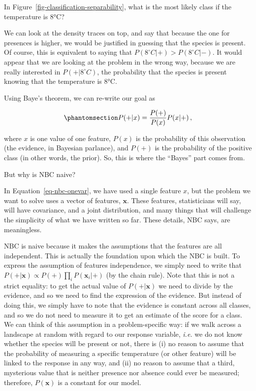 \documentclass[
  letterpaper,
]{scrbook}
\begin{document}
In Figure~\ref{fig-classification-separability}, what is the most likely
class if the temperature is 8°C?

We can look at the density traces on top, and say that because the one
for presences is higher, we would be justified in guessing that the
species is present. Of course, this is equivalent to saying that
\(P(8^\circ C | +) > P(8^\circ C | -)\). It would appear that we are
looking at the problem in the wrong way, because we are really
interested in \(P(+ | 8^\circ C)\), the probability that the species is
present knowing that the temperature is 8°C.

Using Baye's theorem, we can re-write our goal as

\begin{equation}\phantomsection\label{eq-nbc-onevar}{
P(+|x) = \frac{P(+)}{P(x)}P(x|+) \,,
}\end{equation}

where \(x\) is one value of one feature, \(P(x)\) is the probability of
this observation (the evidence, in Bayesian parlance), and \(P(+)\) is
the probability of the positive class (in other words, the prior). So,
this is where the ``Bayes'' part comes from.

But why is NBC naive?

In Equation~\ref{eq-nbc-onevar}, we have used a single feature \(x\),
but the problem we want to solve uses a vector of features,
\(\mathbf{x}\). These features, statisticians will say, will have
covariance, and a joint distribution, and many things that will
challenge the simplicity of what we have written so far. These details,
NBC says, are meaningless.

NBC is naive because it makes the assumptions that the features are all
independent. This is actually the foundation upon which the NBC is
built. To express the assumption of features independence, we simply
need to write that
\(P(+|\mathbf{x}) \propto P(+)\prod_i P(\mathbf{x}_i|+)\) (by the chain
rule). Note that this is not a strict equality: to get the actual value
of \(P(+|\mathbf{x})\) we need to divide by the evidence, and so we need
to find the expression of the evidence. But instead of doing this, we
simply have to note that the evidence is constant across all classes,
and so we do not need to measure it to get an estimate of the score for
a class. We can think of this assumption in a problem-specific way: if
we walk across a landscape at random with regard to our response
variable, \emph{i.e.} we do not know whether the species will be present
or not, there is (i) no reason to assume that the probability of
measuring a specific temperature (or other feature) will be linked to
the response in any way, and (ii) no reason to assume that a third,
mysterious value that is neither presence nor absence could ever be
measured; therefore, \(P(\mathbf{x})\) is a constant for our model.
\end{document}
